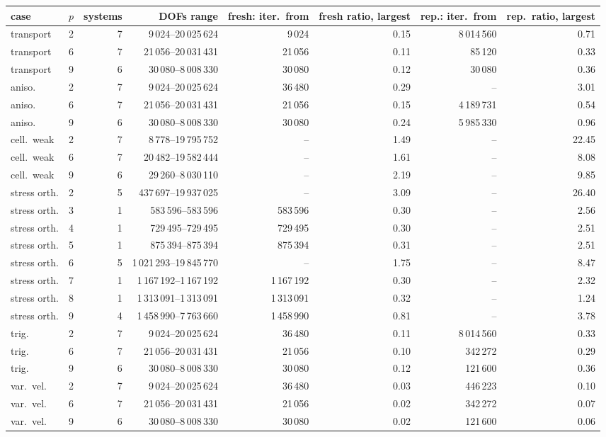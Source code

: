 \begin{tabular}{lrrrrrrr}
\toprule
case & $p$ & systems & DOFs range & fresh: iter.\ from & fresh ratio, largest & rep.: iter.\ from & rep.\ ratio, largest\\
\midrule
transport & 2 & 7 & 9\,024--20\,025\,624 & 9\,024 & 0.15 & 8\,014\,560 & 0.71\\
transport & 6 & 7 & 21\,056--20\,031\,431 & 21\,056 & 0.11 & 85\,120 & 0.33\\
transport & 9 & 6 & 30\,080--8\,008\,330 & 30\,080 & 0.12 & 30\,080 & 0.36\\
aniso. & 2 & 7 & 9\,024--20\,025\,624 & 36\,480 & 0.29 & -- & 3.01\\
aniso. & 6 & 7 & 21\,056--20\,031\,431 & 21\,056 & 0.15 & 4\,189\,731 & 0.54\\
aniso. & 9 & 6 & 30\,080--8\,008\,330 & 30\,080 & 0.24 & 5\,985\,330 & 0.96\\
cell.\ weak & 2 & 7 & 8\,778--19\,795\,752 & -- & 1.49 & -- & 22.45\\
cell.\ weak & 6 & 7 & 20\,482--19\,582\,444 & -- & 1.61 & -- & 8.08\\
cell.\ weak & 9 & 6 & 29\,260--8\,030\,110 & -- & 2.19 & -- & 9.85\\
stress orth. & 2 & 5 & 437\,697--19\,937\,025 & -- & 3.09 & -- & 26.40\\
stress orth. & 3 & 1 & 583\,596--583\,596 & 583\,596 & 0.30 & -- & 2.56\\
stress orth. & 4 & 1 & 729\,495--729\,495 & 729\,495 & 0.30 & -- & 2.51\\
stress orth. & 5 & 1 & 875\,394--875\,394 & 875\,394 & 0.31 & -- & 2.51\\
stress orth. & 6 & 5 & 1\,021\,293--19\,845\,770 & -- & 1.75 & -- & 8.47\\
stress orth. & 7 & 1 & 1\,167\,192--1\,167\,192 & 1\,167\,192 & 0.30 & -- & 2.32\\
stress orth. & 8 & 1 & 1\,313\,091--1\,313\,091 & 1\,313\,091 & 0.32 & -- & 1.24\\
stress orth. & 9 & 4 & 1\,458\,990--7\,763\,660 & 1\,458\,990 & 0.81 & -- & 3.78\\
trig. & 2 & 7 & 9\,024--20\,025\,624 & 36\,480 & 0.11 & 8\,014\,560 & 0.33\\
trig. & 6 & 7 & 21\,056--20\,031\,431 & 21\,056 & 0.10 & 342\,272 & 0.29\\
trig. & 9 & 6 & 30\,080--8\,008\,330 & 30\,080 & 0.12 & 121\,600 & 0.36\\
var.\ vel. & 2 & 7 & 9\,024--20\,025\,624 & 36\,480 & 0.03 & 446\,223 & 0.10\\
var.\ vel. & 6 & 7 & 21\,056--20\,031\,431 & 21\,056 & 0.02 & 342\,272 & 0.07\\
var.\ vel. & 9 & 6 & 30\,080--8\,008\,330 & 30\,080 & 0.02 & 121\,600 & 0.06\\
\bottomrule
\end{tabular}
